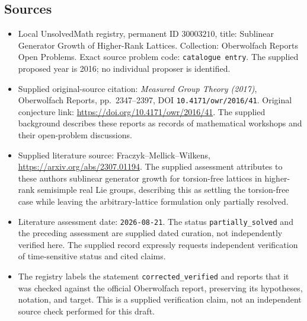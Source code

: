 \documentclass[11pt]{article}
\begin{document}
\subsection{Sources}
\begin{itemize}
\item Local UnsolvedMath registry, permanent ID \(30003210\), title: Sublinear Generator Growth of Higher-Rank Lattices. Collection: Oberwolfach Reports Open Problems. Exact source problem code: \texttt{catalogue entry}. The supplied proposed year is 2016; no individual proposer is identified.
\item Supplied original-source citation: \emph{Measured Group Theory (2017)}, Oberwolfach Reports, pp.\ 2347--2397, DOI \texttt{10.4171/owr/2016/41}. Original conjecture link: \url{https://doi.org/10.4171/owr/2016/41}. The supplied background describes these reports as records of mathematical workshops and their open-problem discussions.
\item Supplied literature source: Fraczyk--Mellick--Wilkens, \url{https://arxiv.org/abs/2307.01194}. The supplied assessment attributes to these authors sublinear generator growth for torsion-free lattices in higher-rank semisimple real Lie groups, describing this as settling the torsion-free case while leaving the arbitrary-lattice formulation only partially resolved.
\item Literature assessment date: \texttt{2026-08-21}. The status \texttt{partially\_solved} and the preceding assessment are supplied dated curation, not independently verified here. The supplied record expressly requests independent verification of time-sensitive status and cited claims.
\item The registry labels the statement \texttt{corrected\_verified} and reports that it was checked against the official Oberwolfach report, preserving its hypotheses, notation, and target. This is a supplied verification claim, not an independent source check performed for this draft.
\end{itemize}
\end{document}
